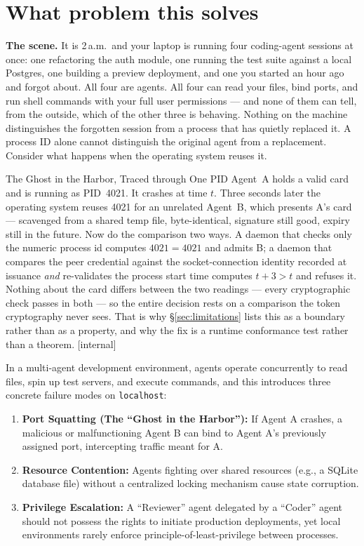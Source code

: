 \documentclass[11pt,a4paper]{article}
\theoremstyle{definition}
\begin{document}
\section{What problem this solves}\label{sec:problem}
\textbf{The scene.} It is 2\,a.m.\ and your laptop is running four coding-agent sessions at once: one refactoring the auth module, one running the test suite against a local Postgres, one building a preview deployment, and one you started an hour ago and forgot about. All four are agents. All four can read your files, bind ports, and run shell commands with your full user permissions --- and none of them can tell, from the outside, which of the other three is behaving. Nothing on the machine distinguishes the forgotten session from a process that has quietly replaced it.
A process ID alone cannot distinguish the original agent from a replacement. Consider what happens when the operating system reuses it.
\begin{pdexample}{The Ghost in the Harbor, Traced through One PID}
\setlength{\parskip}{4pt plus 1pt}
Agent~A holds a valid card and is running as PID~4021. It crashes at time $t$.
Three seconds later the operating system reuses 4021 for an unrelated Agent~B,
which presents A's card --- scavenged from a shared temp file, byte-identical,
signature still good, expiry still in the future.
Now do the comparison two
ways. A daemon that checks only the numeric process id computes $4021 = 4021$
and admits B; a daemon that compares the peer credential against the
socket-connection identity recorded at issuance \emph{and} re-validates the
process start time computes $t+3 > t$ and refuses it.
Nothing about the card
differs between the two readings --- every cryptographic check passes in both
--- so the entire decision rests on a comparison the token cryptography never
sees. That is why \S\ref{sec:limitations} lists this as a boundary rather than
as a property, and why the fix is a runtime conformance test rather than a
theorem. [internal]
\end{pdexample}
In a multi-agent development environment, agents operate concurrently to read files, spin up test servers, and execute commands, and this introduces three concrete failure modes on \texttt{localhost}:
\begin{enumerate}
  \item \textbf{Port Squatting (The ``Ghost in the Harbor''):} If Agent A crashes, a malicious or malfunctioning Agent B can bind to Agent A's previously assigned port, intercepting traffic meant for A.
  \item \textbf{Resource Contention:} Agents fighting over shared resources (e.g., a SQLite database file) without a centralized locking mechanism cause state corruption.
  \item \textbf{Privilege Escalation:} A ``Reviewer'' agent delegated by a ``Coder'' agent should not possess the rights to initiate production deployments, yet local environments rarely enforce principle-of-least-privilege between processes.
\end{enumerate}
\end{document}

